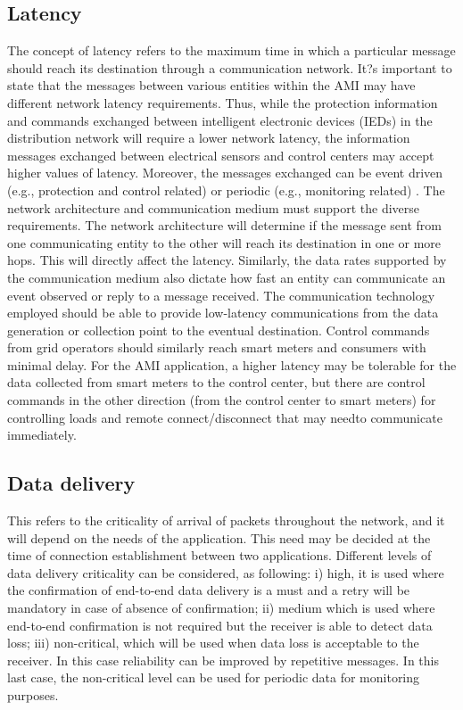 \documentclass[11pt,final,onecolumn]{IEEEtran}
\begin{document}
\subsection{Latency}
The concept of latency refers to the maximum time in which a particular message should reach its destination through a communication network. It?s important to state that the messages between various entities within the AMI may have different network latency requirements. Thus, while the protection information and commands exchanged between intelligent electronic devices (IEDs) in the distribution network will require a lower network latency, the information messages exchanged between electrical sensors and control centers may accept higher values of latency.  Moreover, the messages exchanged can be event driven (e.g., protection and control related) or periodic (e.g., monitoring related) \cite{Winter2012}. The network architecture and communication medium must support the diverse requirements. The network architecture will determine if the message sent from one communicating entity to the other will reach its destination in one or more hops. This will directly affect the latency. Similarly, the data rates supported by the communication medium also dictate how fast an entity can communicate an event observed or reply to a message received.  The communication technology employed should be able to provide low-latency communications from the data generation or collection point to the eventual destination. Control commands from grid operators should similarly reach smart meters and consumers with minimal delay. For the AMI application, a higher latency may be tolerable for the data collected from smart meters to the control center, but there are control commands in the other direction (from the control center to smart meters) for controlling loads and remote connect/disconnect that may needto communicate immediately.

\subsection{Data delivery}
This refers to the criticality of arrival of packets throughout the network, and it will depend on the needs of the application. This need may be decided at the time of connection establishment between two applications. Different levels of data delivery criticality can be considered, as following: i) high, it is used where the confirmation of end-to-end data delivery is a must and a retry will be mandatory in case of absence of confirmation; ii) medium which is used where end-to-end confirmation is not required but the receiver is able to detect data loss; iii) non-critical, which will be used when data loss is acceptable to the receiver. In this case reliability can be improved by repetitive messages. In this last case, the non-critical level can be used for periodic data for monitoring purposes. 
\end{document}
